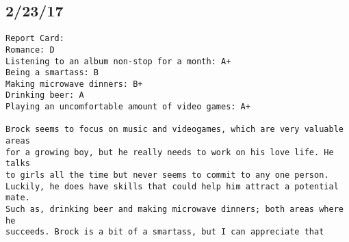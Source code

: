 \documentclass[10pt,letterpaper]{article}
\begin{document}
\subsection*{2/23/17}
\begin{verbatim}
Report Card:
Romance: D
Listening to an album non-stop for a month: A+
Being a smartass: B
Making microwave dinners: B+
Drinking beer: A
Playing an uncomfortable amount of video games: A+

Brock seems to focus on music and videogames, which are very valuable areas
for a growing boy, but he really needs to work on his love life. He talks
to girls all the time but never seems to commit to any one person. 
Luckily, he does have skills that could help him attract a potential mate.
Such as, drinking beer and making microwave dinners; both areas where he 
succeeds. Brock is a bit of a smartass, but I can appreciate that


\end{verbatim}
\end{document}
